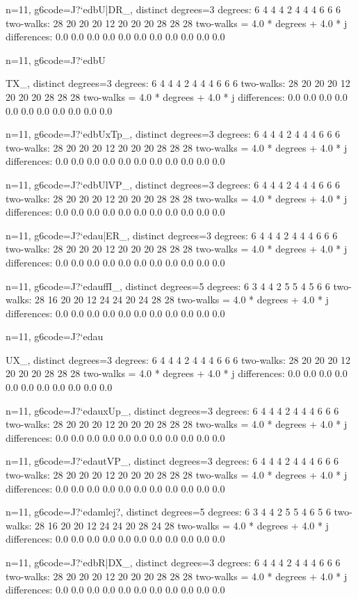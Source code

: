 {{{{{{{{{{{{{{{{{{n=11, g6code=J?`edbU|DR_, distinct degrees=3
degrees: 6 4 4 4 2 4 4 4 6 6 6 
two-walks: 28 20 20 20 12 20 20 20 28 28 28 
two-walks = 4.0 * degrees + 4.0 * j
differences: 0.0 0.0 0.0 0.0 0.0 0.0 0.0 0.0 0.0 0.0 0.0 

n=11, g6code=J?`edbU{TX_, distinct degrees=3
degrees: 6 4 4 4 2 4 4 4 6 6 6 
two-walks: 28 20 20 20 12 20 20 20 28 28 28 
two-walks = 4.0 * degrees + 4.0 * j
differences: 0.0 0.0 0.0 0.0 0.0 0.0 0.0 0.0 0.0 0.0 0.0 

n=11, g6code=J?`edbUxTp_, distinct degrees=3
degrees: 6 4 4 4 2 4 4 4 6 6 6 
two-walks: 28 20 20 20 12 20 20 20 28 28 28 
two-walks = 4.0 * degrees + 4.0 * j
differences: 0.0 0.0 0.0 0.0 0.0 0.0 0.0 0.0 0.0 0.0 0.0 

n=11, g6code=J?`edbUlVP_, distinct degrees=3
degrees: 6 4 4 4 2 4 4 4 6 6 6 
two-walks: 28 20 20 20 12 20 20 20 28 28 28 
two-walks = 4.0 * degrees + 4.0 * j
differences: 0.0 0.0 0.0 0.0 0.0 0.0 0.0 0.0 0.0 0.0 0.0 

n=11, g6code=J?`edau|ER_, distinct degrees=3
degrees: 6 4 4 4 2 4 4 4 6 6 6 
two-walks: 28 20 20 20 12 20 20 20 28 28 28 
two-walks = 4.0 * degrees + 4.0 * j
differences: 0.0 0.0 0.0 0.0 0.0 0.0 0.0 0.0 0.0 0.0 0.0 

n=11, g6code=J?`edauffI_, distinct degrees=5
degrees: 6 3 4 4 2 5 5 4 5 6 6 
two-walks: 28 16 20 20 12 24 24 20 24 28 28 
two-walks = 4.0 * degrees + 4.0 * j
differences: 0.0 0.0 0.0 0.0 0.0 0.0 0.0 0.0 0.0 0.0 0.0 

n=11, g6code=J?`edau{UX_, distinct degrees=3
degrees: 6 4 4 4 2 4 4 4 6 6 6 
two-walks: 28 20 20 20 12 20 20 20 28 28 28 
two-walks = 4.0 * degrees + 4.0 * j
differences: 0.0 0.0 0.0 0.0 0.0 0.0 0.0 0.0 0.0 0.0 0.0 

n=11, g6code=J?`edauxUp_, distinct degrees=3
degrees: 6 4 4 4 2 4 4 4 6 6 6 
two-walks: 28 20 20 20 12 20 20 20 28 28 28 
two-walks = 4.0 * degrees + 4.0 * j
differences: 0.0 0.0 0.0 0.0 0.0 0.0 0.0 0.0 0.0 0.0 0.0 

n=11, g6code=J?`edautVP_, distinct degrees=3
degrees: 6 4 4 4 2 4 4 4 6 6 6 
two-walks: 28 20 20 20 12 20 20 20 28 28 28 
two-walks = 4.0 * degrees + 4.0 * j
differences: 0.0 0.0 0.0 0.0 0.0 0.0 0.0 0.0 0.0 0.0 0.0 

n=11, g6code=J?`edamlej?, distinct degrees=5
degrees: 6 3 4 4 2 5 5 4 6 5 6 
two-walks: 28 16 20 20 12 24 24 20 28 24 28 
two-walks = 4.0 * degrees + 4.0 * j
differences: 0.0 0.0 0.0 0.0 0.0 0.0 0.0 0.0 0.0 0.0 0.0 

n=11, g6code=J?`edbR|DX_, distinct degrees=3
degrees: 6 4 4 4 2 4 4 4 6 6 6 
two-walks: 28 20 20 20 12 20 20 20 28 28 28 
two-walks = 4.0 * degrees + 4.0 * j
differences: 0.0 0.0 0.0 0.0 0.0 0.0 0.0 0.0 0.0 0.0 0.0 

}}}}}}}}}}}}}}}}}}}}
